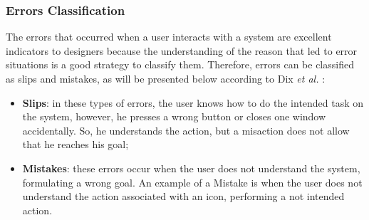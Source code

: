 



\subsubsection{Errors Classification}
\label{subsubsec:errors_classification}
The errors that occurred when a user interacts with a system are excellent indicators to designers because the understanding of the reason that led to error situations is a good strategy to classify them. Therefore, errors can be classified as slips and mistakes, as will be presented below according to Dix \textit{et al.} \cite{humanComputerInteraction}:

\begin{itemize}
	\item \textbf{Slips}: in these types of errors, the user knows how to do the intended task on the system, however, he presses a wrong button or closes one window accidentally. So, he understands the action, but a misaction does not allow that he reaches his goal;
	\item \textbf{Mistakes}: these errors occur when the user does not understand the system, formulating a wrong goal. An example of a Mistake is when the user does not understand the action associated with an icon, performing a not intended action.
\end{itemize}

